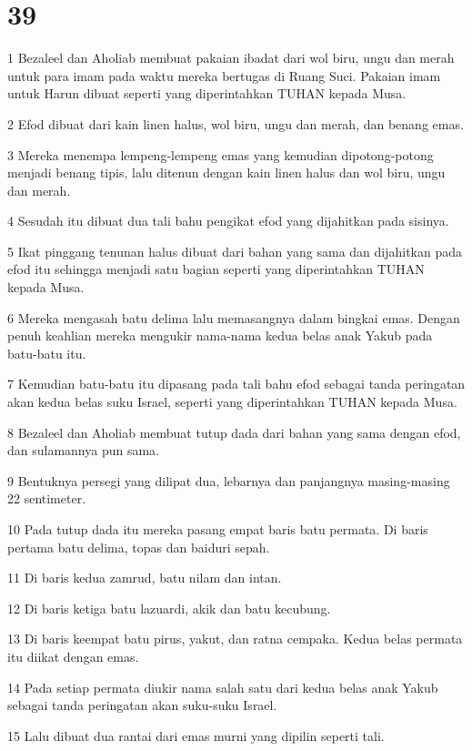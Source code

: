 \chapter{39}

\par 1 Bezaleel dan Aholiab membuat pakaian ibadat dari wol biru, ungu dan merah untuk para imam pada waktu mereka bertugas di Ruang Suci. Pakaian imam untuk Harun dibuat seperti yang diperintahkan TUHAN kepada Musa.
\par 2 Efod dibuat dari kain linen halus, wol biru, ungu dan merah, dan benang emas.
\par 3 Mereka menempa lempeng-lempeng emas yang kemudian dipotong-potong menjadi benang tipis, lalu ditenun dengan kain linen halus dan wol biru, ungu dan merah.
\par 4 Sesudah itu dibuat dua tali bahu pengikat efod yang dijahitkan pada sisinya.
\par 5 Ikat pinggang tenunan halus dibuat dari bahan yang sama dan dijahitkan pada efod itu sehingga menjadi satu bagian seperti yang diperintahkan TUHAN kepada Musa.
\par 6 Mereka mengasah batu delima lalu memasangnya dalam bingkai emas. Dengan penuh keahlian mereka mengukir nama-nama kedua belas anak Yakub pada batu-batu itu.
\par 7 Kemudian batu-batu itu dipasang pada tali bahu efod sebagai tanda peringatan akan kedua belas suku Israel, seperti yang diperintahkan TUHAN kepada Musa.
\par 8 Bezaleel dan Aholiab membuat tutup dada dari bahan yang sama dengan efod, dan sulamannya pun sama.
\par 9 Bentuknya persegi yang dilipat dua, lebarnya dan panjangnya masing-masing 22 sentimeter.
\par 10 Pada tutup dada itu mereka pasang empat baris batu permata. Di baris pertama batu delima, topas dan baiduri sepah.
\par 11 Di baris kedua zamrud, batu nilam dan intan.
\par 12 Di baris ketiga batu lazuardi, akik dan batu kecubung.
\par 13 Di baris keempat batu pirus, yakut, dan ratna cempaka. Kedua belas permata itu diikat dengan emas.
\par 14 Pada setiap permata diukir nama salah satu dari kedua belas anak Yakub sebagai tanda peringatan akan suku-suku Israel.
\par 15 Lalu dibuat dua rantai dari emas murni yang dipilin seperti tali.
